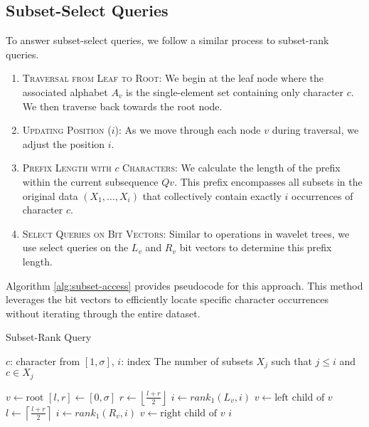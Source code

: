 \subsection{Subset-Select Queries} \label{sec:subset_select_queries}

To answer subset-select queries, we follow a similar process to subset-rank queries.

\begin{enumerate}
    \item \textsc{Traversal from Leaf to Root:} We begin at the leaf node where the associated alphabet $A_v$ is the single-element set containing only character $c$. We then traverse back towards the root node.
    \item \textsc{Updating Position} ($i$): As we move through each node $v$ during traversal, we adjust the position $i$.
    \item \textsc{Prefix Length with $c$ Characters}: We calculate the length of the prefix within the current subsequence $Qv$. This prefix encompasses all subsets in the original data $(X_1,\dots, X_i)$ that collectively contain exactly $i$ occurrences of character $c$.
    \item \textsc{Select Queries on Bit Vectors}: Similar to operations in wavelet trees, we use select queries on the $L_v$ and $R_v$ bit vectors to determine this prefix length.
\end{enumerate}

\noindent Algorithm \ref{alg:subset-access} provides pseudocode for this approach. This method leverages the bit vectors to efficiently locate specific character occurrences without iterating through the entire dataset.

\begin{algorithm}[h]
    \caption{Subset-Rank Query}
    \label{alg:subset-rank}
    \begin{algorithmic}[1]
        \Require $c$: character from $[1, \sigma]$, $i$: index
        \Ensure The number of subsets $X_j$ such that $j \leq i$ and $c \in X_j$
    \end{algorithmic}
    \begin{algorithmic}
        \State $v \gets \text{root}$
        \State $[l, r] \gets [0, \sigma]$ 
        \State $r \gets \left\lfloor \frac{l+r}{2} \right\rfloor$
        \State $i \gets rank_1(L_v, i)$
        \State $v \gets \text{left child of } v$
        \Else
        \State $l \gets \left\lceil \frac{l+r}{2} \right\rceil$
        \State $i \gets rank_1(R_v, i)$
        \State $v \gets \text{right child of } v$
        \EndIf
        \EndWhile
        \State \Return $i$
        \EndFunction
    \end{algorithmic}
\end{algorithm}

